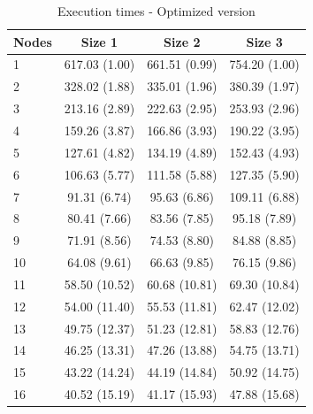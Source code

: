 \documentclass{article}
\begin{document}
\begin{table}[H]
\centering
\begin{tabular}{|l|c|c|c|}
\hline
Nodes & Size 1 & Size 2 & Size 3 \\ \hline
1 & 617.03 (1.00) & 661.51 (0.99) & 754.20 (1.00) \\ \hline
2 & 328.02 (1.88) & 335.01 (1.96) & 380.39 (1.97) \\ \hline
3 & 213.16 (2.89) & 222.63 (2.95) & 253.93 (2.96) \\ \hline
4 & 159.26 (3.87) & 166.86 (3.93) & 190.22 (3.95) \\ \hline
5 & 127.61 (4.82) & 134.19 (4.89) & 152.43 (4.93) \\ \hline
6 & 106.63 (5.77) & 111.58 (5.88) & 127.35 (5.90) \\ \hline
7 & 91.31 (6.74) & 95.63 (6.86) & 109.11 (6.88) \\ \hline
8 & 80.41 (7.66) & 83.56 (7.85) & 95.18 (7.89) \\ \hline
9 & 71.91 (8.56) & 74.53 (8.80) & 84.88 (8.85) \\ \hline
10 & 64.08 (9.61) & 66.63 (9.85) & 76.15 (9.86) \\ \hline
11 & 58.50 (10.52) & 60.68 (10.81) & 69.30 (10.84) \\ \hline
12 & 54.00 (11.40) & 55.53 (11.81) & 62.47 (12.02) \\ \hline
13 & 49.75 (12.37) & 51.23 (12.81) & 58.83 (12.76) \\ \hline
14 & 46.25 (13.31) & 47.26 (13.88) & 54.75 (13.71) \\ \hline
15 & 43.22 (14.24) & 44.19 (14.84) & 50.92 (14.75) \\ \hline
16 & 40.52 (15.19) & 41.17 (15.93) & 47.88 (15.68) \\ \hline
\end{tabular}
\caption{Execution times - Optimized version} \label{tab:optimizedtimes}
\end{table}
\end{document}
